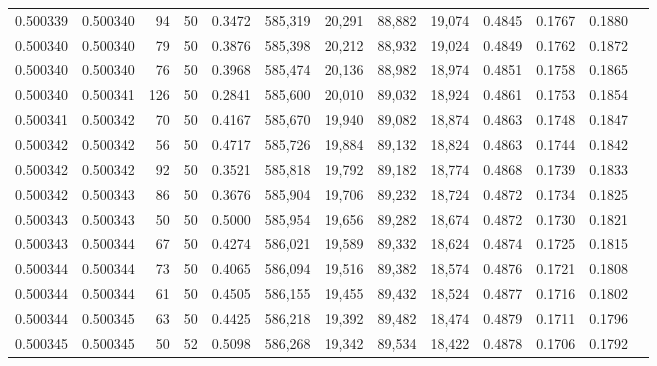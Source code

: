 \begin{tabular}{rrrrrrrrrrrrr}
0.500339 & 0.500340 &    94 &  50 &                                     0.3472 & 585,319 &  20,291 &  88,882 &  19,074 & 0.4845 & 0.1767 & 0.1880 \\
0.500340 & 0.500340 &    79 &  50 &                                     0.3876 & 585,398 &  20,212 &  88,932 &  19,024 & 0.4849 & 0.1762 & 0.1872 \\
0.500340 & 0.500340 &    76 &  50 &                                     0.3968 & 585,474 &  20,136 &  88,982 &  18,974 & 0.4851 & 0.1758 & 0.1865 \\
0.500340 & 0.500341 &   126 &  50 &                                     0.2841 & 585,600 &  20,010 &  89,032 &  18,924 & 0.4861 & 0.1753 & 0.1854 \\
0.500341 & 0.500342 &    70 &  50 &                                     0.4167 & 585,670 &  19,940 &  89,082 &  18,874 & 0.4863 & 0.1748 & 0.1847 \\
0.500342 & 0.500342 &    56 &  50 &                                     0.4717 & 585,726 &  19,884 &  89,132 &  18,824 & 0.4863 & 0.1744 & 0.1842 \\
0.500342 & 0.500342 &    92 &  50 &                                     0.3521 & 585,818 &  19,792 &  89,182 &  18,774 & 0.4868 & 0.1739 & 0.1833 \\
0.500342 & 0.500343 &    86 &  50 &                                     0.3676 & 585,904 &  19,706 &  89,232 &  18,724 & 0.4872 & 0.1734 & 0.1825 \\
0.500343 & 0.500343 &    50 &  50 &                                     0.5000 & 585,954 &  19,656 &  89,282 &  18,674 & 0.4872 & 0.1730 & 0.1821 \\
0.500343 & 0.500344 &    67 &  50 &                                     0.4274 & 586,021 &  19,589 &  89,332 &  18,624 & 0.4874 & 0.1725 & 0.1815 \\
0.500344 & 0.500344 &    73 &  50 &                                     0.4065 & 586,094 &  19,516 &  89,382 &  18,574 & 0.4876 & 0.1721 & 0.1808 \\
0.500344 & 0.500344 &    61 &  50 &                                     0.4505 & 586,155 &  19,455 &  89,432 &  18,524 & 0.4877 & 0.1716 & 0.1802 \\
0.500344 & 0.500345 &    63 &  50 &                                     0.4425 & 586,218 &  19,392 &  89,482 &  18,474 & 0.4879 & 0.1711 & 0.1796 \\
0.500345 & 0.500345 &    50 &  52 &                                     0.5098 & 586,268 &  19,342 &  89,534 &  18,422 & 0.4878 & 0.1706 & 0.1792 \\

\end{tabular}
